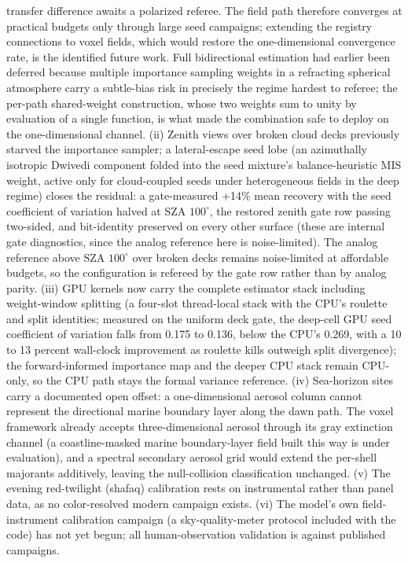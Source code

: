 \documentclass[preprint,12pt]{elsarticle}
\begin{document}
transfer difference awaits a polarized referee. The field path
therefore converges at practical budgets only through large seed
campaigns; extending the registry connections to voxel fields, which
would restore the one-dimensional convergence rate, is the identified
future work. Full bidirectional estimation had earlier been deferred
because multiple importance sampling weights in a refracting
spherical atmosphere carry a subtle-bias risk in precisely the regime
hardest to referee; the per-path shared-weight construction, whose
two weights sum to unity by evaluation of a single function, is what
made the combination safe to deploy on the one-dimensional channel.
(ii) Zenith views over broken cloud decks previously starved the
importance sampler; a lateral-escape seed lobe (an azimuthally
isotropic Dwivedi component folded into the seed mixture's
balance-heuristic MIS weight, active only for cloud-coupled seeds
under heterogeneous fields in the deep regime) closes the residual:
a gate-measured +14\% mean recovery with the seed coefficient of
variation halved at
SZA $100^{\circ}$, the restored zenith gate row passing two-sided,
and bit-identity preserved on every other surface (these are internal
gate diagnostics, since the analog reference here is noise-limited). The analog
reference above SZA $100^{\circ}$ over broken decks remains
noise-limited at affordable budgets, so the configuration is refereed
by the gate row rather than by analog parity. (iii) GPU kernels now carry the complete estimator stack including
weight-window splitting (a four-slot thread-local stack with the
CPU's roulette and split identities; measured on the uniform deck
gate, the deep-cell GPU seed coefficient of variation falls from
0.175 to 0.136, below the CPU's 0.269, with a 10 to 13 percent
wall-clock improvement as roulette kills outweigh split divergence);
the forward-informed importance map and the deeper CPU stack remain
CPU-only, so the CPU path stays the formal variance reference. (iv) Sea-horizon sites carry a
documented open offset: a one-dimensional aerosol column cannot
represent the directional marine boundary layer along the dawn path.
The voxel framework already accepts three-dimensional aerosol through
its gray extinction channel (a coastline-masked marine
boundary-layer field built this way is under evaluation), and a
spectral secondary aerosol grid would extend the per-shell majorants
additively, leaving the null-collision classification unchanged. (v) The evening red-twilight
(shafaq) calibration rests on instrumental rather than panel data, as no
color-resolved modern campaign exists. (vi) The model's own
field-instrument calibration campaign (a sky-quality-meter protocol
included with the code) has not yet begun; all human-observation validation is
against published campaigns.
\end{document}
